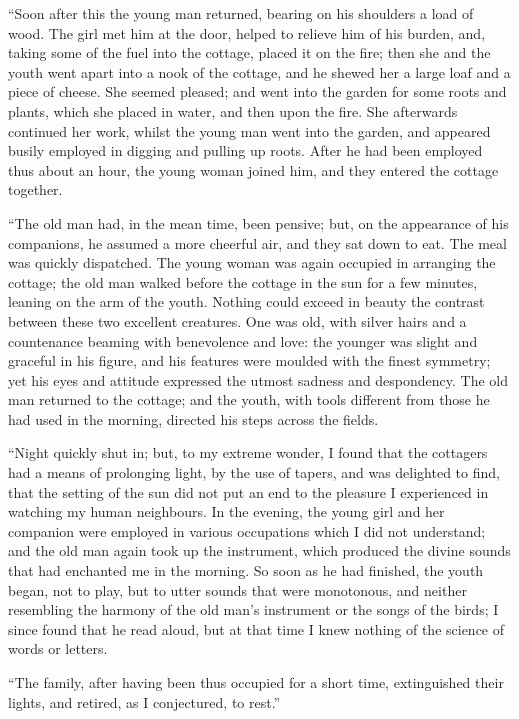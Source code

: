``Soon after this the young man returned,
bearing on his shoulders a load
of wood. The girl met him at the door,
helped to relieve him of his burden, and,
taking some of the fuel into the cottage,
placed it on the fire; then she and the
youth went apart into a nook of the
cottage, and he shewed her a large loaf
and a piece of cheese. She seemed
pleased; and went into the garden for
some roots and plants, which she placed
in water, and then upon the fire. She
afterwards continued her work, whilst
the young man went into the garden,
and appeared busily employed in digging
and pulling up roots. After he
had been employed thus about an hour,
the young woman joined him, and they
entered the cottage together.

``The old man had, in the mean time,
been pensive; but, on the appearance
of his companions, he assumed a more
cheerful air, and they sat down to eat.
The meal was quickly dispatched. The
young woman was again occupied
in arranging the cottage; the old man
walked before the cottage in the sun
for a few minutes, leaning on the arm
of the youth. Nothing could exceed in
beauty the contrast between these two
excellent creatures. One was old, with
silver hairs and a countenance beaming
with benevolence and love: the younger
was slight and graceful in his figure,
and his features were moulded with the
finest symmetry; yet his eyes and attitude
expressed the utmost sadness and
despondency. The old man returned
to the cottage; and the youth, with
tools different from those he had used
in the morning, directed his steps
across the fields.

``Night quickly shut in; but, to my
extreme wonder, I found that the
cottagers had a means of prolonging
light, by the use of tapers, and
was delighted to find, that the setting
of the sun did not put an end to the
pleasure I experienced in watching
my human neighbours. In the
evening, the young girl and her companion
were employed in various occupations
which I did not understand; and the
old man again took up the instrument,
which produced the divine sounds that
had enchanted me in the morning. So
soon as he had finished, the youth
began, not to play, but to utter sounds
that were monotonous, and neither resembling
the harmony of the old man's
instrument or the songs of the birds; I
since found that he read aloud, but at
that time I knew nothing of the science
of words or letters.

``The family, after having been thus
occupied for a short time, extinguished
their lights, and retired, as I conjectured,
to rest.''

